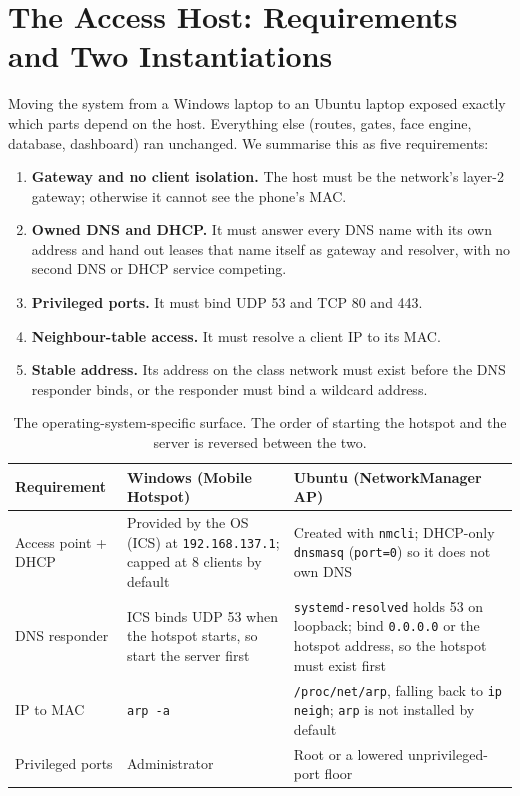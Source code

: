 \documentclass[11pt,a4paper]{article}
\newcommand{\code}[1]{\texttt{#1}}
\begin{document}
\section{The Access Host: Requirements and Two Instantiations}\label{sec:host}
Moving the system from a Windows laptop to an Ubuntu laptop exposed exactly which parts depend on the host. Everything else (routes, gates, face engine, database, dashboard) ran unchanged. We summarise this as five requirements:
\begin{enumerate}[leftmargin=*,itemsep=1pt,label=\textbf{H\arabic*}]
\item \textbf{Gateway and no client isolation.} The host must be the network's layer-2 gateway; otherwise it cannot see the phone's MAC.
\item \textbf{Owned DNS and DHCP.} It must answer every DNS name with its own address and hand out leases that name itself as gateway and resolver, with no second DNS or DHCP service competing.
\item \textbf{Privileged ports.} It must bind UDP 53 and TCP 80 and 443.
\item \textbf{Neighbour-table access.} It must resolve a client IP to its MAC.
\item \textbf{Stable address.} Its address on the class network must exist before the DNS responder binds, or the responder must bind a wildcard address.
\end{enumerate}

\begin{table}[t]
\centering
\small
\begin{tabular}{@{}p{2.6cm}p{5.5cm}p{5.8cm}@{}}
\toprule
Requirement & Windows (Mobile Hotspot) & Ubuntu (NetworkManager AP) \\
\midrule
Access point + DHCP & Provided by the OS (ICS) at \code{192.168.137.1}; capped at 8 clients by default & Created with \code{nmcli}; DHCP-only \code{dnsmasq} (\code{port=0}) so it does not own DNS \\
\addlinespace
DNS responder & ICS binds UDP 53 when the hotspot starts, so start the server first & \code{systemd-resolved} holds 53 on loopback; bind \code{0.0.0.0} or the hotspot address, so the hotspot must exist first \\
\addlinespace
IP to MAC & \code{arp -a} & \code{/proc/net/arp}, falling back to \code{ip neigh}; \code{arp} is not installed by default \\
\addlinespace
Privileged ports & Administrator & Root or a lowered unprivileged-port floor \\
\bottomrule
\end{tabular}
\caption{The operating-system-specific surface. The order of starting the hotspot and the server is reversed between the two.}
\label{tab:os}
\end{table}
\end{document}
